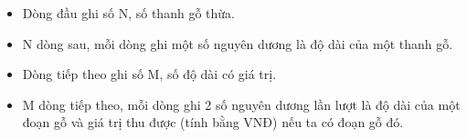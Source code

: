 \begin{itemize}
	\item     Dòng đầu ghi số N, số thanh gỗ thừa.   
	\item     N dòng sau, mỗi dòng ghi một số nguyên dương là độ dài của một thanh gỗ.   
	\item     Dòng tiếp theo ghi số M, số độ dài có giá trị.   
	\item     M dòng tiếp theo, mỗi dòng ghi 2 số nguyên dương lần lượt là độ dài của một đoạn gỗ và giá trị thu được (tính bằng VNĐ) nếu ta có đoạn gỗ đó.   
\end{itemize}